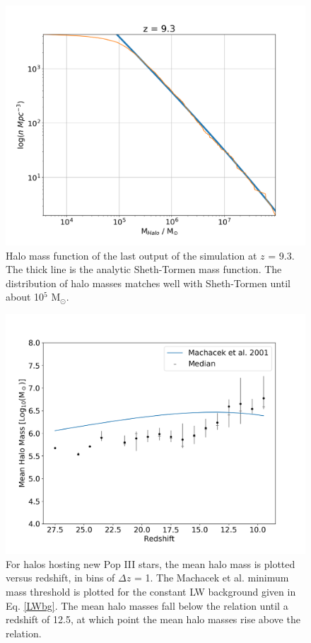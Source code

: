 \documentclass[a4paper,fleqn,usenatbib]{mnras}
\begin{document}
\begin{figure}
	\includegraphics[width=\columnwidth]{images/hmf.png}
    \caption{Halo mass function of the last output of the simulation at $z$ = 9.3. The thick line is the analytic Sheth-Tormen mass function. The distribution of halo masses matches well with Sheth-Tormen until about 10$^{5}$ M$_{\odot}$.}
    \label{fig:hmf}
\end{figure}

\begin{figure}
	\includegraphics[width=\columnwidth]{images/mean_mass_errorb_fix.png}
    \caption{For halos hosting new Pop III stars, the mean halo mass is plotted versus redshift, in bins of $\Delta z$ = 1. The Machacek et al. minimum mass threshold is plotted for the constant LW background given in Eq. \ref{LWbg}. The mean halo masses fall below the relation until a redshift of 12.5, at which point the mean halo masses rise above the relation.}
    \label{fig:mean_mass}
\end{figure}
\end{document}
